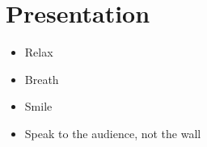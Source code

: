 \documentclass{beamer}
\begin{document}
\section{Presentation}
\begin{frame}{\insertsection}{\insertsubsection}
    \begin{itemize}
        \item Relax
        \item Breath
        \item Smile
        \item Speak to the audience, not the wall
    \end{itemize}
\end{frame}
\end{document}
